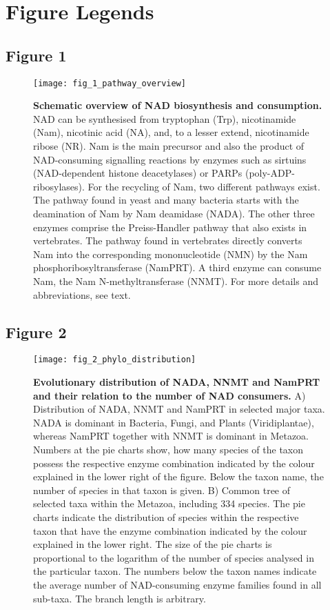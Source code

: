 
\newpage

\section{Figure Legends}

\subsection{Figure 1}

\begin{figure}[ht]
  \centering
  \texttt{[image: fig\_1\_pathway\_overview]}
  \caption{\textbf{Schematic overview of NAD biosynthesis and consumption.} NAD can be synthesised from tryptophan (Trp), nicotinamide (Nam), nicotinic acid (NA), and, to a lesser extend, nicotinamide ribose (NR). Nam is the main precursor and also the product of NAD-consuming signalling reactions by enzymes such as sirtuins (NAD-dependent histone deacetylases) or PARPs (poly-ADP-ribosylases). For the recycling of Nam, two different pathways exist. The pathway found in yeast and many bacteria starts with the deamination of Nam by Nam deamidase (NADA). The other three enzymes comprise the Preiss-Handler pathway that also exists in vertebrates. The pathway found in vertebrates directly converts Nam into the corresponding mononucleotide (NMN) by the Nam phosphoribosyltransferase (NamPRT). A third enzyme can consume Nam, the Nam N-methyltransferase (NNMT). For more details and abbreviations, see text.}
  \label{fig:pathway_overview}
\end{figure}

\newpage


\subsection{Figure 2}

\begin{figure}[ht]
  \centering
  \texttt{[image: fig\_2\_phylo\_distribution]}
  \caption{\textbf{Evolutionary distribution of NADA, NNMT and NamPRT and their relation to the number of NAD consumers.} A) Distribution of NADA, NNMT and NamPRT in selected major taxa. NADA is dominant in Bacteria, Fungi, and Plants (Viridiplantae), whereas NamPRT together with NNMT is dominant in Metazoa. Numbers at the pie charts show, how many species of the taxon possess the respective enzyme combination indicated by the colour explained in the lower right of the figure. Below the taxon name, the number of species in that taxon is given. B) Common tree of selected taxa within the Metazoa, including 334 species. The pie charts indicate the distribution of species within the respective taxon that have the enzyme combination indicated by the colour explained in the lower right. The size of the pie charts is proportional to the logarithm of the number of species analysed in the particular taxon. The numbers below the taxon names indicate the average number of NAD-consuming enzyme families found in all sub-taxa. The branch length is arbitrary.}
  \label{fig:phylo_distribution}
\end{figure}

